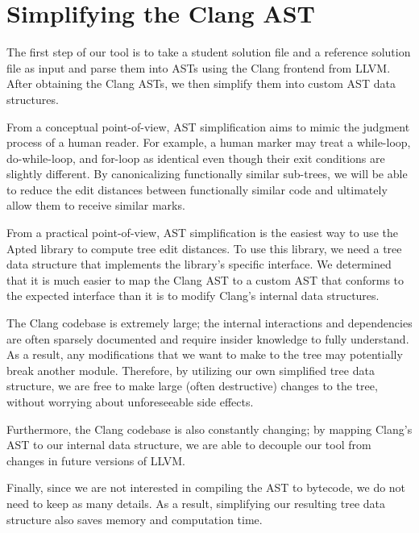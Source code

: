 \section{Simplifying the Clang AST}

The first step of our tool is to take a student solution file and a reference solution file as input and parse them into ASTs using the Clang frontend from LLVM. After obtaining the Clang ASTs, we then simplify them into custom AST data structures.

From a conceptual point-of-view, AST simplification aims to mimic the judgment process of a human reader. For example, a human marker may treat a while-loop, do-while-loop, and for-loop as identical even though their exit conditions are slightly different. By canonicalizing functionally similar sub-trees, we will be able to reduce the edit distances between functionally similar code and ultimately allow them to receive similar marks.

From a practical point-of-view, AST simplification is the easiest way to use the Apted library \cite{pawlik2011rted} to compute tree edit distances. To use this library, we need a tree data structure that implements the library's specific interface. We determined that it is much easier to map the Clang AST to a custom AST that conforms to the expected interface than it is to modify Clang's internal data structures.

The Clang codebase is extremely large; the internal interactions and dependencies are often sparsely documented and require insider knowledge to fully understand. As a result, any modifications that we want to make to the tree may potentially break another module. Therefore, by utilizing our own simplified tree data structure, we are free to make large (often destructive) changes to the tree, without worrying about unforeseeable side effects.

Furthermore, the Clang codebase is also constantly changing; by mapping Clang's AST to our internal data structure, we are able to decouple our tool from changes in future versions of LLVM.

Finally, since we are not interested in compiling the AST to bytecode, we do not need to keep as many details. As a result, simplifying our resulting tree data structure also saves memory and computation time.

